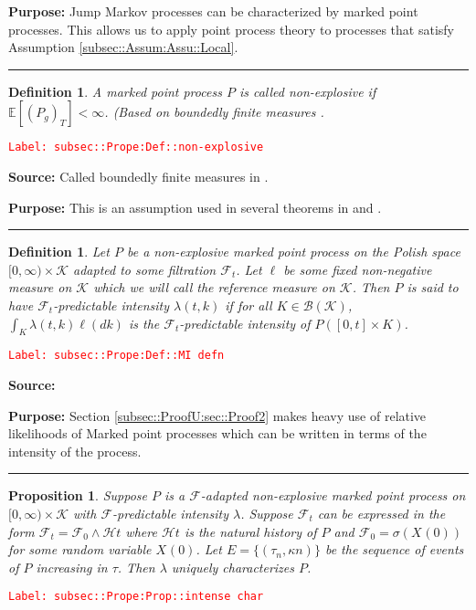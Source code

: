 \documentclass[12pt]{article}
\newcommand{\mb}{\mathbb}
\newcommand{\mc}{\mathcal}
\newcommand{\ms}{\mathscr}
\newcommand{\tr}{\textcolor{red}}
\newcommand{\labe}[1]{\tr{\texttt{Label: #1}}}
\newcommand{\purpose}{\textbf{Purpose: }}
\newcommand{\lin}{\rule{\linewidth}{0.4 pt}}
\newcommand{\ex}[1]{\mb{E}\left[#1\right]}			%
\renewcommand{\t}{t}							%
\newcommand{\F}{\mc{F}}							%
\newcommand{\FH}{\mc{H}}						%
\newcommand{\X}{X}								%
\newcommand{\cind}[1]{_{#1}}					%
\newcommand{\tp}[1]{(#1)}						%
\newcommand{\ts}[1]{_{#1}}						%
\newcommand{\rate}{\lambda}						%
\newcommand{\indx}[1]{_{#1}}					%
\newcommand{\rt}{\tau}							%
\renewcommand{\mark}{\kappa}					%
\newcommand{\rp}{P}								%
\newcommand{\mspce}{\mc{K}}						%
\newcommand{\rpg}{\rp_g}						%
\newtheorem{prop}[thms]{Proposition}
\newtheorem{defn}[thms]{Definition}
\begin{document}
\purpose Jump Markov processes can be characterized by marked point processes. This allows us to apply point process theory to processes that satisfy Assumption \ref{subsec::Assum:Assu::Local}.

\lin

\begin{defn}
A marked point process \(\rp\) is called non-explosive if \(\ex{(\rpg)_T} < \infty\). (Based on boundedly finite measures \cite[Definition 9.1.I]{DalVer08}.
\label{subsec::Prope:Def::non-explosive}
\end{defn}
\labe{subsec::Prope:Def::non-explosive}

\textbf{Source: } Called boundedly finite measures in \cite[Definition 9.1.I]{DalVer08}.

\purpose This is an assumption used in several theorems in \cite{DalVer03} and \cite{DalVer08}.

\lin

\begin{defn}
Let \(\rp\) be a non-explosive marked point process on the Polish space \([0,\infty)\times \mspce\) adapted to some filtration \(\F\ts{\t}\). Let \(\ell\) be some fixed non-negative measure on \(\mspce\) which we will call the reference measure on \(\mspce\). Then \(\rp\) is said to have \(\F\ts{\t}\)-predictable intensity \(\rate(\t,k)\) if for all \(K \in \ms{B}(\mspce)\), \(\int_K \rate(\t,k)\ell(dk)\) is the \(\F\ts{\t}\)-predictable intensity of \(\rp([0,\t]\times K)\). 
\label{subsec::Prope:Def::MI defn}
\end{defn}
\labe{subsec::Prope:Def::MI defn}

\textbf{Source: }\cite[Definition 14.3.I]{DalVer08}

\purpose Section \ref{subsec::ProofU:sec::Proof2} makes heavy use of relative likelihoods of Marked point processes which can be written in terms of the intensity of the process.

\lin

\begin{prop}
Suppose \(\rp\) is a \(\F\)-adapted non-explosive marked point process on \([0,\infty)\times \mspce\) with \(\F\)-predictable intensity \(\rate\). Suppose \(\F\ts{\t}\) can be expressed in the form \(\F\ts{\t} = \F\ts{0}\wedge \FH{\t}\) where \(\FH{\t}\) is the natural history of \(\rp\) and \(\F\ts{0} = \sigma(\X\cind{}\tp{0})\) for some random variable \(\X\cind{}\tp{0}\). Let \(E = \{(\rt\indx{n},\mark{n})\}\) be the sequence of events of \(\rp\) increasing in \(\rt\). Then \(\rate\) uniquely characterizes \(\rp\).
\label{subsec::Prope:Prop::intense char}
\end{prop}
\labe{subsec::Prope:Prop::intense char}
\end{document}
